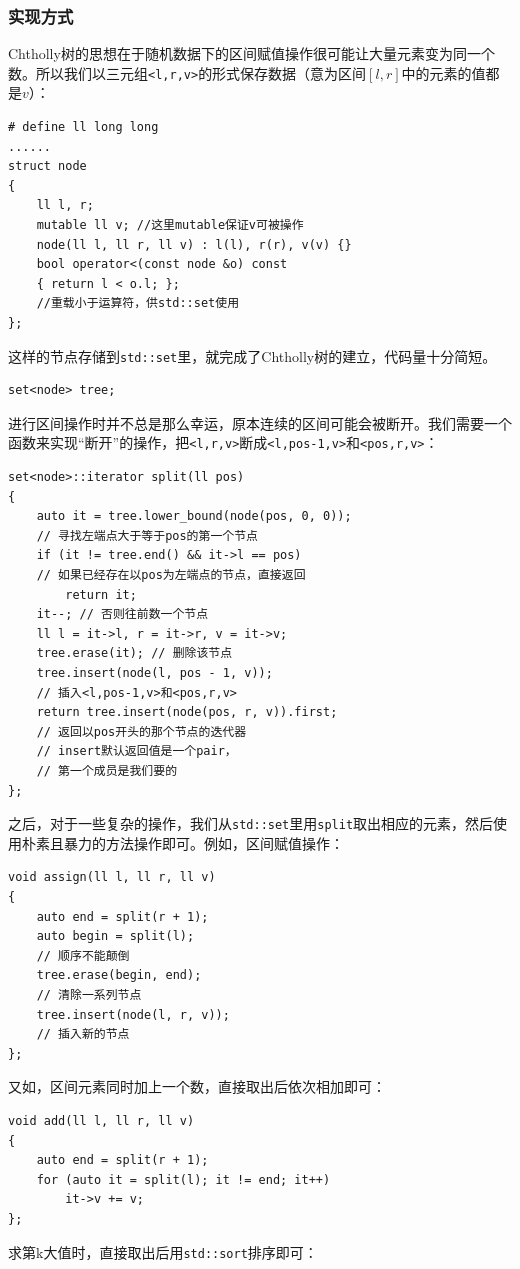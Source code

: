 \documentclass{cjc}
\begin{document}
\subsubsection{实现方式}
Chtholly树的思想在于随机数据下的区间赋值操作很可能让大量元素变为同一个数。所以我们以三元组\lstinline{<l,r,v>}的形式保存数据（意为区间$[l,r]$中的元素的值都是$v$）：
\begin{lstlisting}
# define ll long long
......
struct node
{
    ll l, r;
    mutable ll v; //这里mutable保证v可被操作
    node(ll l, ll r, ll v) : l(l), r(r), v(v) {} 
    bool operator<(const node &o) const 
    { return l < o.l; };
    //重载小于运算符，供std::set使用
};
\end{lstlisting}
这样的节点存储到\lstinline{std::set}里，就完成了Chtholly树的建立，代码量十分简短。
\begin{lstlisting}
set<node> tree;
\end{lstlisting}
进行区间操作时并不总是那么幸运，原本连续的区间可能会被断开。我们需要一个函数来实现“断开”的操作，把\lstinline{<l,r,v>}断成\lstinline{<l,pos-1,v>}和\lstinline{<pos,r,v>}：
\begin{lstlisting}
set<node>::iterator split(ll pos)
{
    auto it = tree.lower_bound(node(pos, 0, 0)); 
    // 寻找左端点大于等于pos的第一个节点
    if (it != tree.end() && it->l == pos) 
    // 如果已经存在以pos为左端点的节点，直接返回
        return it;
    it--; // 否则往前数一个节点
    ll l = it->l, r = it->r, v = it->v;
    tree.erase(it); // 删除该节点
    tree.insert(node(l, pos - 1, v)); 
    // 插入<l,pos-1,v>和<pos,r,v>
    return tree.insert(node(pos, r, v)).first; 
    // 返回以pos开头的那个节点的迭代器
    // insert默认返回值是一个pair，
    // 第一个成员是我们要的
};
\end{lstlisting}
之后，对于一些复杂的操作，我们从\lstinline{std::set}里用\lstinline{split}取出相应的元素，然后使用朴素且暴力的方法操作即可。例如，区间赋值操作：
\begin{lstlisting}
void assign(ll l, ll r, ll v)
{
    auto end = split(r + 1);
    auto begin = split(l); 
    // 顺序不能颠倒
    tree.erase(begin, end); 
    // 清除一系列节点
    tree.insert(node(l, r, v)); 
    // 插入新的节点
};
\end{lstlisting}
又如，区间元素同时加上一个数，直接取出后依次相加即可：
\begin{lstlisting}
void add(ll l, ll r, ll v)
{
    auto end = split(r + 1);
    for (auto it = split(l); it != end; it++)
        it->v += v;
};
\end{lstlisting}
求第k大值时，直接取出后用\lstinline{std::sort}排序即可：
\end{document}
